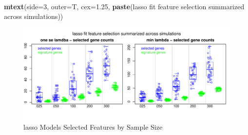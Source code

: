 \documentclass[
]{book}
\newenvironment{Shaded}{\begin{snugshade}}{\end{snugshade}}
\newcommand{\DataTypeTok}[1]{\textcolor[rgb]{0.13,0.29,0.53}{#1}}
\newcommand{\DecValTok}[1]{\textcolor[rgb]{0.00,0.00,0.81}{#1}}
\newcommand{\FloatTok}[1]{\textcolor[rgb]{0.00,0.00,0.81}{#1}}
\newcommand{\KeywordTok}[1]{\textcolor[rgb]{0.13,0.29,0.53}{\textbf{#1}}}
\newcommand{\NormalTok}[1]{#1}
\newcommand{\StringTok}[1]{\textcolor[rgb]{0.31,0.60,0.02}{#1}}
\begin{document}
\begin{Shaded}
\begin{Highlighting}[]
\KeywordTok{mtext}\NormalTok{(}\DataTypeTok{side=}\DecValTok{3}\NormalTok{, }\DataTypeTok{outer=}\NormalTok{T, }\DataTypeTok{cex=}\FloatTok{1.25}\NormalTok{, }\KeywordTok{paste}\NormalTok{(}\StringTok{\textquotesingle{}lasso fit feature selection summarized across simulations\textquotesingle{}}\NormalTok{))}
\end{Highlighting}
\end{Shaded}

\begin{figure}
\centering
\includegraphics{Static/figures/lasso-simRes-features-OverSim-1.pdf}
\caption{\label{fig:lasso-simRes-features-OverSim}lasso Models Selected Features by Sample Size}
\end{figure}
\end{document}

